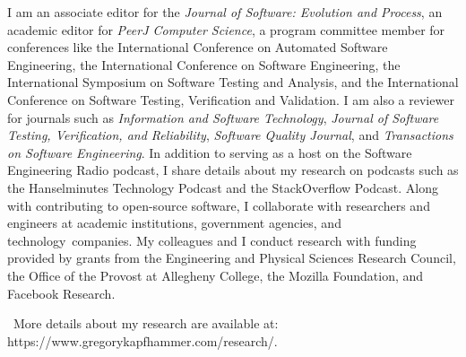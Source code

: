 \documentclass[11pt,letterpaper,sans]{moderncv}
\newcommand{\golink}{\faLink}
\begin{document}
{\small
  I am an associate editor for the {\em Journal of Software: Evolution and Process},
  an academic editor for {\em PeerJ Computer Science}, a program
  committee member for conferences like the International Conference on
  Automated Software Engineering, the International Conference on Software
  Engineering, the International Symposium on Software Testing and Analysis, and
  the International Conference on Software Testing, Verification and Validation.
  I am also a reviewer for journals such as {\em Information and Software
  Technology}, {\em Journal of Software Testing, Verification, and Reliability},
  {\em Software Quality Journal}, and {\em Transactions on Software
  Engineering}. In addition to serving as a host on the Software Engineering
  Radio podcast, I share details about my research on podcasts such as the
  Hanselminutes Technology Podcast and the StackOverflow Podcast. Along with
  contributing to open-source software, I collaborate with researchers and
  engineers at academic institutions, government agencies, and
  \mbox{technology companies}. My colleagues and I conduct research with funding
  provided by grants from the Engineering and Physical Sciences Research
  Council, the Office of the Provost at Allegheny College, the Mozilla
  Foundation, and Facebook Research.
}

  \vspace*{.1in}
  {\small \golink{}~More details about my research are available at:
  https://www.gregorykapfhammer.com/research/}.

%


%
\nocite{*}

%
\setlength\bibitemsep{-.15in}

%
\renewcommand*{\bibfont}{\small}

%

%
\printbibliography[filter=papers,title={Research Publications}]
\end{document}
